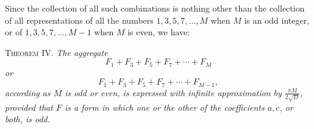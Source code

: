 \documentclass[12pt]{article}
\begin{document}
Since the collection of all such combinations is nothing other than the collection of all representations of all the numbers $1,3,5,7,\ldots,M$ when $M$ is an odd integer, or of $1,3,5,7,\ldots,M-1$ when $M$ is even, we have:

\textsc{Theorem IV.} \emph{The aggregate}
\[
F_1+F_3+F_5+F_7+\cdots+F_M
\]
\emph{or}
\[
F_1+F_3+F_5+F_7+\cdots+F_{M-1},
\]
\emph{according as $M$ is odd or even, is expressed with infinite approximation by $\frac{\pi M}{2\sqrt D}$, provided that $F$ is a form in which one or the other of the coefficients $a,c$, or both, is odd.}
\end{document}
